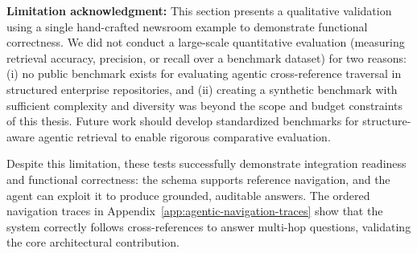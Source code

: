 \textbf{Limitation acknowledgment:} This section presents a qualitative validation using a single hand-crafted newsroom example to demonstrate functional correctness. We did not conduct a large-scale quantitative evaluation (measuring retrieval accuracy, precision, or recall over a benchmark dataset) for two reasons: (i) no public benchmark exists for evaluating agentic cross-reference traversal in structured enterprise repositories, and (ii) creating a synthetic benchmark with sufficient complexity and diversity was beyond the scope and budget constraints of this thesis. Future work should develop standardized benchmarks for structure-aware agentic retrieval to enable rigorous comparative evaluation.

Despite this limitation, these tests successfully demonstrate integration readiness and functional correctness: the schema supports reference navigation, and the agent can exploit it to produce grounded, auditable answers. The ordered navigation traces in Appendix~\ref{app:agentic-navigation-traces} show that the system correctly follows cross-references to answer multi-hop questions, validating the core architectural contribution.




